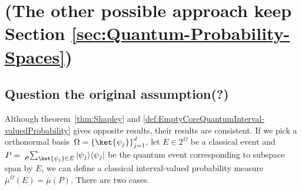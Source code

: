 \documentclass{article}
\theoremstyle{remark}
\newcommand{\proj}[1]{|#1 \rangle\langle #1 |}
\begin{document}
\section{(The other possible approach keep Section \ref{sec:Quantum-Probability-Spaces}) }



\subsection{Question the original assumption(?)}

Although theorem~\ref{thm:Shapley} and \ref{def:EmptyCoreQuantumInterval-valuedProbability}
gives opposite results, their results are consistent. If we pick a
orthonormal basis~$\Omega=\left\{ \ket{\psi_{j}}\right\} _{j=1}^{d}$,
let $E\in2^{\Omega}$ be a classical event and $P=\tensor*[_{\mathscr{O}}]{\sum}{_{\ket{\psi_{j}}\in E}}\proj{\psi_{j}}$
be the quantum event corresponding to subspace span by $E$, we can
define a classical interval-valued probability measure$\bar{\mu}^{\Omega}\left(E\right)=\bar{\mu}\left(P\right)$.
There are two cases.
\end{document}
